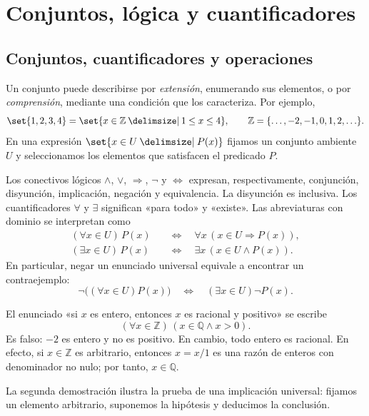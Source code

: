 \section{Conjuntos, lógica y cuantificadores}\label{sec:preliminares-conjuntos}

\subsection{Conjuntos, cuantificadores y operaciones}\label{tema:1-1-1}\label{tema:1-1-2}
Un conjunto puede describirse por \emph{extensión}, enumerando sus elementos, o por \emph{comprensión}, mediante una condición que los caracteriza. Por ejemplo,
\[
\set{1,2,3,4}=\set{x\in\mathbb Z\given1\le x\le4},
\qquad \mathbb Z=\{\ldots,-2,-1,0,1,2,\ldots\}.
\]
En una expresión $\set{x\in U\given P(x)}$ fijamos un conjunto ambiente $U$ y seleccionamos los elementos que satisfacen el predicado $P$.

Los conectivos lógicos $\land$, $\lor$, $\Rightarrow$, $\neg$ y $\Leftrightarrow$ expresan, respectivamente, conjunción, disyunción, implicación, negación y equivalencia. La disyunción es inclusiva. Los cuantificadores $\forall$ y $\exists$ significan «para todo» y «existe». Las abreviaturas con dominio se interpretan como
\[
\begin{aligned}
(\forall x\in U)\,P(x)&\quad\Longleftrightarrow\quad
\forall x\,(x\in U\Rightarrow P(x)),\\
(\exists x\in U)\,P(x)&\quad\Longleftrightarrow\quad
\exists x\,(x\in U\land P(x)).
\end{aligned}
\]
En particular, negar un enunciado universal equivale a encontrar un contraejemplo:
\[
\neg\bigl((\forall x\in U)P(x)\bigr)
\quad\Longleftrightarrow\quad (\exists x\in U)\neg P(x).
\]

\begin{ejem}
El enunciado «si $x$ es entero, entonces $x$ es racional y positivo» se escribe
\[
(\forall x\in\mathbb Z)\,(x\in\mathbb Q\land x>0).
\]
Es falso: $-2$ es entero y no es positivo. En cambio, todo entero es racional. En efecto, si $x\in\mathbb Z$ es arbitrario, entonces $x=x/1$ es una razón de enteros con denominador no nulo; por tanto, $x\in\mathbb Q$.
\end{ejem}
La segunda demostración ilustra la prueba de una implicación universal: fijamos un elemento arbitrario, suponemos la hipótesis y deducimos la conclusión.

